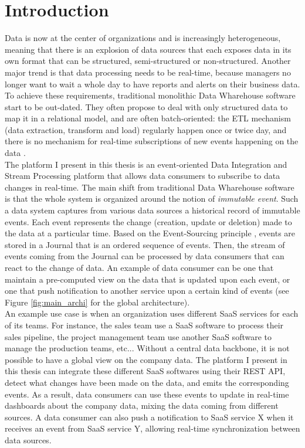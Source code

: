 \chapter{Introduction}

Data is now at the center of organizations and is increasingly heterogeneous, meaning that there is an explosion of data sources 
that each exposes data in its own format that can be structured, semi-structured or non-structured.
Another major trend is that data processing needs to be real-time, because managers no longer want to wait a whole day 
to have reports and alerts on their business data.
\\

To achieve these requirements, traditional monolithic Data Wharehouse software start to be out-dated. They often
propose to deal with only structured data to map it in a relational model, and are often batch-oriented: 
the ETL mechanism (data extraction, transform and load) regularly happen once or twice day, and there is no mechanism 
for real-time subscriptions of new events happening on the data .
\\

The platform I present in this thesis is an event-oriented Data Integration and Stream Processing platform that allows data consumers
to subscribe to data changes in real-time. The main shift from traditional Data Wharehouse software is that the whole
system is organized around the notion of \textit{immutable event}. Such a data system captures from various data sources
a historical record of immutable events. Each event represents the change (creation, update or deletion) made to the data at a particular time. 
Based on the Event-Sourcing principle , events are stored in a Journal that is an ordered sequence of 
events. Then, the stream of events coming from the Journal can be processed by data consumers that can react to the change of data. 
An example of data consumer can be one that maintain a pre-computed view on the data that is updated upon each event, or one that push 
notification to another service upon a certain kind of events (see Figure \ref{fig:main_archi} for the global architecture).
\\

An example use case is when an organization uses different SaaS services for each of its teams. For instance, the sales
team use a SaaS software to process their sales pipeline, the project management team use another SaaS software to manage
the production teams, etc... Without a central data backbone, it is not possible to have a global view on the company data.
The platform I present in this thesis can integrate these different SaaS softwares using their REST API, detect what
changes have been made on the data, and emits the corresponding events. As a result, data consumers can use these events
to update in real-time dashboards about the company data, mixing the data coming from different sources. A data consumer can also push a
notification to SaaS service X when it receives an event from SaaS service Y, allowing real-time synchronization between
data sources.
\\

